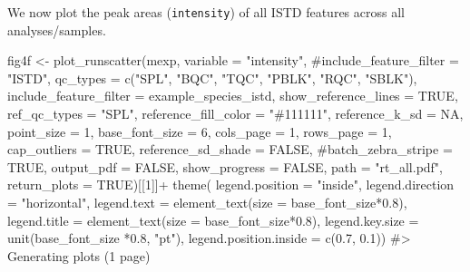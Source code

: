 \documentclass[
  letterpaper,
  DIV=11,
  numbers=noendperiod]{scrartcl}
\newenvironment{Shaded}{\begin{snugshade}}{\end{snugshade}}
\newcommand{\AttributeTok}[1]{\textcolor[rgb]{0.40,0.45,0.13}{#1}}
\newcommand{\CommentTok}[1]{\textcolor[rgb]{0.37,0.37,0.37}{#1}}
\newcommand{\ConstantTok}[1]{\textcolor[rgb]{0.56,0.35,0.01}{#1}}
\newcommand{\DecValTok}[1]{\textcolor[rgb]{0.68,0.00,0.00}{#1}}
\newcommand{\FloatTok}[1]{\textcolor[rgb]{0.68,0.00,0.00}{#1}}
\newcommand{\FunctionTok}[1]{\textcolor[rgb]{0.28,0.35,0.67}{#1}}
\newcommand{\NormalTok}[1]{\textcolor[rgb]{0.00,0.23,0.31}{#1}}
\newcommand{\OtherTok}[1]{\textcolor[rgb]{0.00,0.23,0.31}{#1}}
\newcommand{\SpecialCharTok}[1]{\textcolor[rgb]{0.37,0.37,0.37}{#1}}
\newcommand{\StringTok}[1]{\textcolor[rgb]{0.13,0.47,0.30}{#1}}
\begin{document}
We now plot the peak areas (\texttt{intensity}) of all ISTD features
across all analyses/samples.

\begin{Shaded}
\begin{Highlighting}[]
\NormalTok{fig4f }\OtherTok{\textless{}{-}} \FunctionTok{plot\_runscatter}\NormalTok{(mexp, }\AttributeTok{variable =} \StringTok{"intensity"}\NormalTok{, }
                \CommentTok{\#include\_feature\_filter = "ISTD", }
                \AttributeTok{qc\_types =} \FunctionTok{c}\NormalTok{(}\StringTok{"SPL"}\NormalTok{, }\StringTok{"BQC"}\NormalTok{, }\StringTok{"TQC"}\NormalTok{, }\StringTok{"PBLK"}\NormalTok{, }\StringTok{"RQC"}\NormalTok{, }\StringTok{"SBLK"}\NormalTok{), }
                \AttributeTok{include\_feature\_filter =}\NormalTok{ example\_species\_istd,}
                \AttributeTok{show\_reference\_lines =} \ConstantTok{TRUE}\NormalTok{,}
                \AttributeTok{ref\_qc\_types =} \StringTok{"SPL"}\NormalTok{,}
                \AttributeTok{reference\_fill\_color =} \StringTok{"\#111111"}\NormalTok{,}
                \AttributeTok{reference\_k\_sd =} \ConstantTok{NA}\NormalTok{,}
                \AttributeTok{point\_size =} \DecValTok{1}\NormalTok{,}
                \AttributeTok{base\_font\_size =} \DecValTok{6}\NormalTok{,}
                \AttributeTok{cols\_page =} \DecValTok{1}\NormalTok{,}
                \AttributeTok{rows\_page =} \DecValTok{1}\NormalTok{,}
                \AttributeTok{cap\_outliers =} \ConstantTok{TRUE}\NormalTok{,}
                \AttributeTok{reference\_sd\_shade =} \ConstantTok{FALSE}\NormalTok{,}
                \CommentTok{\#batch\_zebra\_stripe = TRUE, }
                \AttributeTok{output\_pdf =} \ConstantTok{FALSE}\NormalTok{, }
                \AttributeTok{show\_progress =} \ConstantTok{FALSE}\NormalTok{,}
                \AttributeTok{path =} \StringTok{"rt\_all.pdf"}\NormalTok{,}
                \AttributeTok{return\_plots =} \ConstantTok{TRUE}\NormalTok{)[[}\DecValTok{1}\NormalTok{]]}\SpecialCharTok{+}
  \FunctionTok{theme}\NormalTok{(}
    \AttributeTok{legend.position =} \StringTok{"inside"}\NormalTok{,}
    \AttributeTok{legend.direction =} \StringTok{"horizontal"}\NormalTok{, }
    \AttributeTok{legend.text =} \FunctionTok{element\_text}\NormalTok{(}\AttributeTok{size =}\NormalTok{ base\_font\_size}\SpecialCharTok{*}\FloatTok{0.8}\NormalTok{), }
    \AttributeTok{legend.title =} \FunctionTok{element\_text}\NormalTok{(}\AttributeTok{size =}\NormalTok{ base\_font\_size}\SpecialCharTok{*}\FloatTok{0.8}\NormalTok{),}
    \AttributeTok{legend.key.size =} \FunctionTok{unit}\NormalTok{(base\_font\_size }\SpecialCharTok{*}\FloatTok{0.8}\NormalTok{, }\StringTok{"pt"}\NormalTok{), }
    \AttributeTok{legend.position.inside =} \FunctionTok{c}\NormalTok{(}\FloatTok{0.7}\NormalTok{, }\FloatTok{0.1}\NormalTok{))}
\CommentTok{\#\textgreater{} Generating plots (1 page)}
\end{Highlighting}
\end{Shaded}
\end{document}
